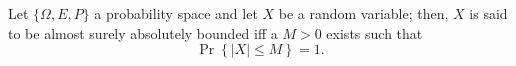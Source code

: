 \documentclass[12pt]{article}
\begin{document}
Let $\{\Omega ,E,P\}$ a probability space and let $X$ be a random
variable; then, $X$ is said to be almost surely absolutely bounded iff a  $M>0$ exists such that
\[
\Pr \left\{ \left\vert X\right\vert \leq M\right\} =1.
\]
\end{document}
